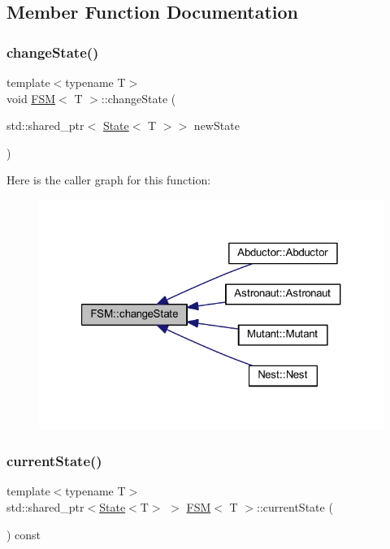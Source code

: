 \subsection{Member Function Documentation}
\mbox{\label{class_f_s_m_a241c2f5192c96fe2c24b319dd5a3f64b}} 
\subsubsection{\texorpdfstring{change\+State()}{changeState()}}
{\footnotesize\ttfamily template$<$typename T$>$ \\
void \hyperlink{class_f_s_m}{F\+SM}$<$ T $>$\+::change\+State (\begin{DoxyParamCaption}\item[{std\+::shared\+\_\+ptr$<$ \hyperlink{class_state}{State}$<$ T $>$$>$}]{new\+State }\end{DoxyParamCaption})\hspace{0.3cm}{\ttfamily [inline]}}

Here is the caller graph for this function\+:
\nopagebreak
\begin{figure}[H]
\begin{center}
\leavevmode
\includegraphics[width=321pt]{class_f_s_m_a241c2f5192c96fe2c24b319dd5a3f64b_icgraph}
\end{center}
\end{figure}
\mbox{\label{class_f_s_m_a5fcece234f05f8cbeeb650f01a842c51}} 
\subsubsection{\texorpdfstring{current\+State()}{currentState()}}
{\footnotesize\ttfamily template$<$typename T$>$ \\
std\+::shared\+\_\+ptr$<$\hyperlink{class_state}{State}$<$T$>$ $>$ \hyperlink{class_f_s_m}{F\+SM}$<$ T $>$\+::current\+State (\begin{DoxyParamCaption}{ }\end{DoxyParamCaption}) const\hspace{0.3cm}{\ttfamily [inline]}}

